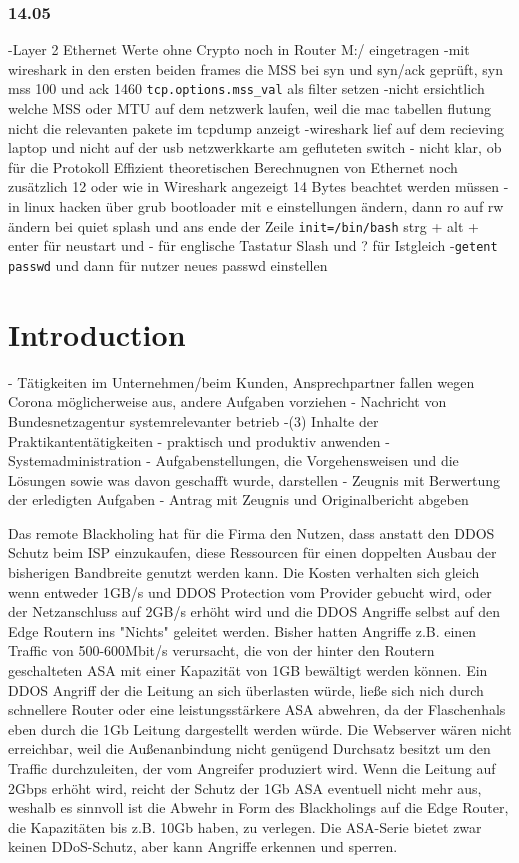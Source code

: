 \documentclass[english,runningheads,a4paper]{llncs}[2018/03/10]
\begin{document}
\subsubsection{14.05}
-Layer 2 Ethernet Werte ohne Crypto noch in Router M:/ eingetragen
-mit wireshark in den ersten beiden frames die MSS bei syn und syn/ack geprüft, syn mss 100 und ack 1460 \texttt{tcp.options.mss\_val} als filter setzen
-nicht ersichtlich welche MSS oder MTU auf dem netzwerk laufen, weil die mac tabellen flutung nicht die relevanten pakete im tcpdump anzeigt
-wireshark lief auf dem recieving laptop und nicht auf der usb netzwerkkarte am gefluteten switch
- nicht klar, ob für die Protokoll Effizient theoretischen Berechnugnen von Ethernet noch zusätzlich 12 oder wie in Wireshark angezeigt 14 Bytes beachtet werden müssen
-in linux hacken über grub bootloader mit e einstellungen ändern, dann ro auf rw ändern bei quiet splash und ans ende der Zeile \texttt{init=/bin/bash} strg + alt + enter für neustart und - für englische Tastatur Slash und ? für Istgleich
-\texttt{getent passwd} und dann für nutzer neues passwd einstellen
\section{Introduction}\label{sec:intro}
- Tätigkeiten im Unternehmen/beim Kunden, Ansprechpartner fallen wegen Corona möglicherweise aus, andere Aufgaben vorziehen
- Nachricht von Bundesnetzagentur systemrelevanter betrieb
-(3) Inhalte der Praktikantentätigkeiten
- praktisch und produktiv anwenden
- Systemadministration
- Aufgabenstellungen,  die  Vorgehensweisen  und  die  Lösungen sowie was davon geschafft wurde, darstellen
- Zeugnis mit Berwertung der erledigten Aufgaben
- Antrag mit Zeugnis und Originalbericht abgeben

Das remote Blackholing hat für die Firma den Nutzen, dass anstatt den DDOS Schutz beim ISP einzukaufen, diese Ressourcen für einen doppelten Ausbau der bisherigen Bandbreite genutzt werden kann. Die Kosten verhalten sich gleich wenn entweder  1GB/s und DDOS Protection vom Provider gebucht wird, oder der Netzanschluss auf 2GB/s erhöht wird und die DDOS Angriffe selbst auf den Edge Routern ins "Nichts" geleitet werden. Bisher hatten Angriffe z.B. einen Traffic von 500-600Mbit/s verursacht, die von der hinter den Routern geschalteten ASA mit einer Kapazität von 1GB bewältigt werden können. Ein DDOS Angriff der die Leitung an sich überlasten würde, ließe sich nich durch schnellere Router oder eine leistungsstärkere ASA abwehren, da der Flaschenhals eben durch die 1Gb Leitung dargestellt werden würde. Die Webserver wären nicht erreichbar, weil die Außenanbindung  nicht genügend Durchsatz besitzt um den Traffic durchzuleiten, der vom Angreifer produziert wird. Wenn die Leitung auf 2Gbps erhöht wird, reicht der Schutz der 1Gb ASA eventuell nicht mehr aus, weshalb es sinnvoll ist die Abwehr in Form des Blackholings auf die Edge Router, die Kapazitäten bis z.B. 10Gb haben, zu verlegen. Die ASA-Serie bietet zwar keinen DDoS-Schutz, aber kann Angriffe erkennen und sperren.
\end{document}
